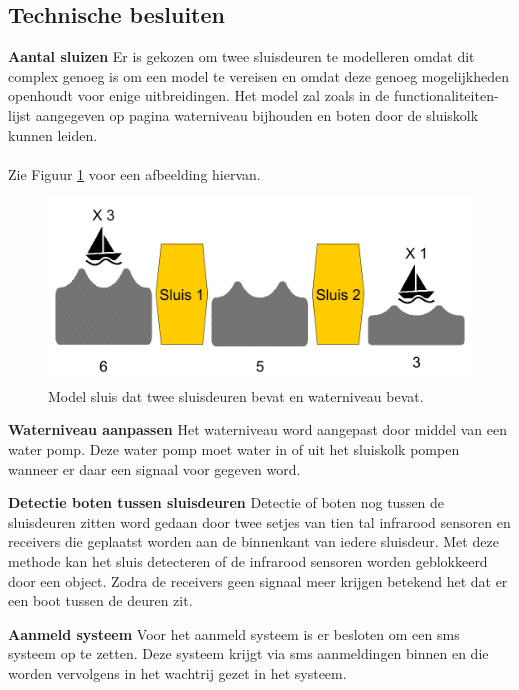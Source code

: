 \documentclass{article}
\begin{document}
\subsection{Technische besluiten}
\textbf{Aantal sluizen}\newline
Er is gekozen om twee sluisdeuren te modelleren omdat dit complex genoeg is om een model te vereisen en omdat deze genoeg mogelijkheden openhoudt voor enige uitbreidingen. Het model zal zoals in de functionaliteiten-lijst aangegeven op pagina \pageref{sec:FuncList} waterniveau bijhouden en boten door de sluiskolk kunnen leiden.\\\\
Zie Figuur \ref{fig:sluiceWaterLv} voor een afbeelding hiervan. 
\begin{figure}[!h]
	\centering
	\includegraphics[width=\textwidth]{images/sluis_model.png}
    \caption{Model sluis dat twee sluisdeuren bevat en waterniveau bevat.}
	\label{fig:sluiceWaterLv}
\end{figure}

\noindent\textbf{Waterniveau aanpassen}\newline
Het waterniveau word aangepast door middel van een water pomp. Deze water pomp moet water in of uit het sluiskolk pompen wanneer er daar een signaal voor gegeven word.\newline

\noindent\textbf{Detectie boten tussen sluisdeuren}\newline
Detectie of boten nog tussen de sluisdeuren zitten word gedaan door twee setjes van tien tal infrarood sensoren en receivers die geplaatst worden aan de binnenkant van iedere sluisdeur. Met deze methode kan het sluis detecteren of de infrarood sensoren worden geblokkeerd door een object. Zodra de receivers geen signaal meer krijgen betekend het dat er een boot tussen de deuren zit.\newline

\noindent\textbf{Aanmeld systeem}\newline
Voor het aanmeld systeem is er besloten om een sms systeem op te zetten. Deze systeem krijgt via sms aanmeldingen binnen en die worden vervolgens in het wachtrij gezet in het systeem. \newline \\
\end{document}
